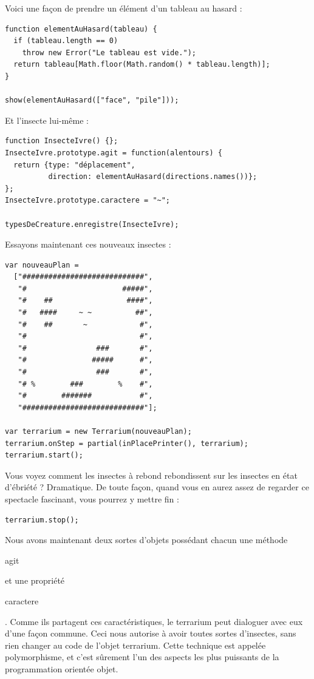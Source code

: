 \documentclass{FramateX}
\renewcommand{\texttt}[1]{\begin{sffamily}{#1}\end{sffamily}}
\begin{document}
Voici une façon de prendre un élément d'un tableau au hasard :

\begin{lstlisting}
function elementAuHasard(tableau) {
  if (tableau.length == 0)
    throw new Error("Le tableau est vide.");
  return tableau[Math.floor(Math.random() * tableau.length)];
}

show(elementAuHasard(["face", "pile"]));
\end{lstlisting}
Et l'insecte lui-même :

\begin{lstlisting}
function InsecteIvre() {};
InsecteIvre.prototype.agit = function(alentours) {
  return {type: "déplacement",
          direction: elementAuHasard(directions.names())};
};
InsecteIvre.prototype.caractere = "~";

typesDeCreature.enregistre(InsecteIvre);
\end{lstlisting}
\begin{center}\end{center}

Essayons maintenant ces nouveaux insectes :

\begin{lstlisting}
var nouveauPlan =
  ["############################",
   "#                      #####",
   "#    ##                 ####",
   "#   ####     ~ ~          ##",
   "#    ##       ~            #",
   "#                          #",
   "#                ###       #",
   "#               #####      #",
   "#                ###       #",
   "# %        ###        %    #",
   "#        #######           #",
   "############################"];

var terrarium = new Terrarium(nouveauPlan);
terrarium.onStep = partial(inPlacePrinter(), terrarium);
terrarium.start();
\end{lstlisting}
Vous voyez comment les insectes à rebond rebondissent sur les insectes
en état d'ébriété ? Dramatique. De toute façon, quand vous en aurez
assez de regarder ce spectacle fascinant, vous pourrez y mettre fin :

\begin{lstlisting}
terrarium.stop();
\end{lstlisting}
\begin{center}\end{center}

Nous avons maintenant deux sortes d'objets possédant chacun une méthode
\texttt{agit} et une propriété \texttt{caractere}. Comme ils partagent
ces caractéristiques, le terrarium peut dialoguer avec eux d'une façon
commune. Ceci nous autorise à avoir toutes sortes d'insectes, sans rien
changer au code de l'objet terrarium. Cette technique est appelée
polymorphisme, et c'est sûrement l'un des aspects les plus puissants de
la programmation orientée objet.
\end{document}
